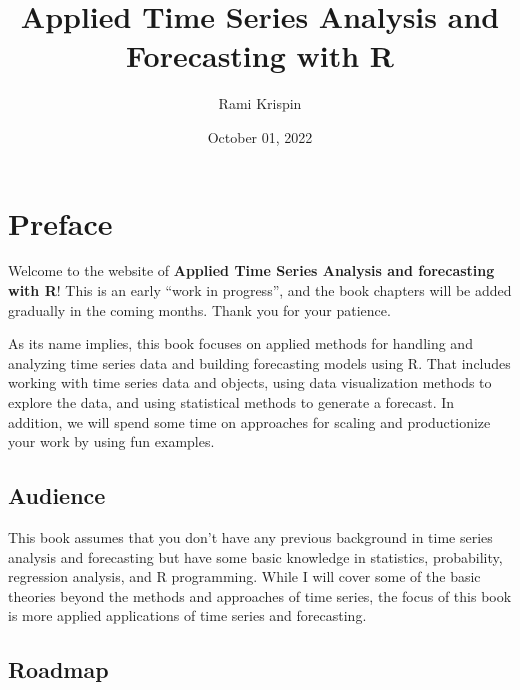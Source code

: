 \documentclass[
  letterpaper,
  DIV=11,
  numbers=noendperiod]{scrreprt}
\title{Applied Time Series Analysis and Forecasting with R}
\author{Rami Krispin}
\date{October 01, 2022}
\renewcommand*\contentsname{Table of contents}
\newcommand\contentsname{Table of contents}
\begin{document}
\maketitle
\ifdefined\Shaded\renewenvironment{Shaded}{\begin{tcolorbox}[boxrule=0pt, breakable, interior hidden, borderline west={3pt}{0pt}{shadecolor}, frame hidden, enhanced, sharp corners]}{\end{tcolorbox}}\fi

\renewcommand*\contentsname{Table of contents}
{
\hypersetup{linkcolor=}
\setcounter{tocdepth}{2}
\tableofcontents
}

\hypertarget{preface}{%
\chapter*{Preface}\label{preface}}

Welcome to the website of \textbf{Applied Time Series Analysis and
forecasting with R}! This is an early ``work in progress'', and the book
chapters will be added gradually in the coming months. Thank you for
your patience.

As its name implies, this book focuses on applied methods for handling
and analyzing time series data and building forecasting models using R.
That includes working with time series data and objects, using data
visualization methods to explore the data, and using statistical methods
to generate a forecast. In addition, we will spend some time on
approaches for scaling and productionize your work by using fun
examples.

\hypertarget{audience}{%
\section*{Audience}\label{audience}}

This book assumes that you don't have any previous background in time
series analysis and forecasting but have some basic knowledge in
statistics, probability, regression analysis, and R programming. While I
will cover some of the basic theories beyond the methods and approaches
of time series, the focus of this book is more applied applications of
time series and forecasting.

\hypertarget{roadmap}{%
\section*{Roadmap}\label{roadmap}}
\end{document}
